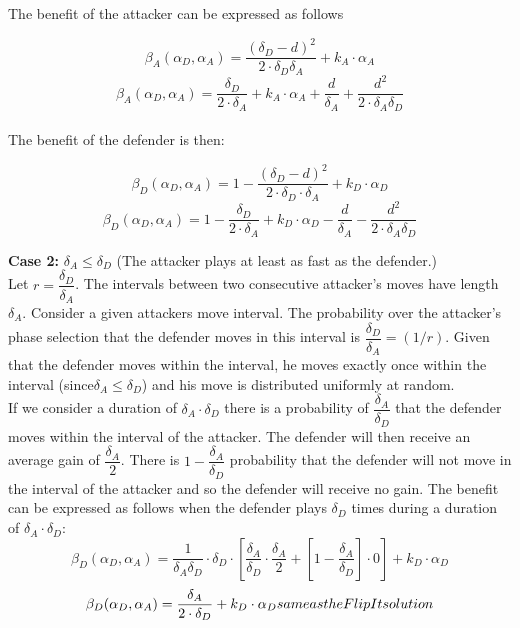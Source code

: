 The benefit of the attacker can be expressed as follows

\begin{equation}\label{first}
\beta_{A}(\alpha_{D},\alpha_{A}) = \dfrac { (\delta_{D}-d) ^{2}} {2 \cdot \delta_{D}  \delta_{A}} + k_{A} \cdot \alpha_{A}
\end{equation}
\begin{equation}\label{first}
\beta_{A}(\alpha_{D},\alpha_{A}) = \dfrac { \delta_{D}} {2 \cdot \delta_{A}} + k_{A} \cdot \alpha_{A} + \dfrac{d}{\delta_{A}} + \dfrac{d^{2}}{2 \cdot \delta_{A} \delta_{D}}
\end{equation}
\\

The benefit of the defender is then:

\begin{equation}\label{first}
\beta_{D}(\alpha_{D},\alpha_{A}) = 1 - \dfrac { (\delta_{D}-d) ^{2}} {2 \cdot \delta_{D} \cdot \delta_{A}} + k_{D} \cdot \alpha_{D}
\end{equation}
\begin{equation}\label{first}
\beta_{D}(\alpha_{D},\alpha_{A}) = 1 - \dfrac { \delta_{D}} {2 \cdot \delta_{A}} + k_{D} \cdot \alpha_{D} - \dfrac{d}{\delta_{A}}- \dfrac{d^{2}}{2 \cdot \delta_{A} \delta_{D}}
\end{equation}


\textbf{Case 2:} $\delta_{A} \leq \delta_{D} $ (The attacker plays at least as fast as the defender.) \\

Let $r = \dfrac{\delta_{D}}{ \delta_{A} }$. The intervals between two consecutive attacker's moves have length $\delta_{A}$. Consider a given attackers move interval. The probability over the attacker's phase selection that the defender moves in this interval is $\dfrac{\delta_{D}}{ \delta_{A} } = (1/r)$. Given that the defender moves within the interval, he moves exactly once within the interval (since$\delta_{A} \leq \delta_{D} $) and his move is distributed uniformly at random. \\

If we consider a duration of $\delta_{A} \cdot \delta_{D} $ there is a probability of $\dfrac{\delta_{A} } {\delta_{D}} $ that the defender moves within the interval of the attacker. The defender will then receive an average gain of $\dfrac{\delta_{A}} {2} $. There is $1- \dfrac{\delta_{A} } {\delta_{D}} $ probability that the defender will not move in the interval of the attacker and so the defender will receive no gain. The benefit can be expressed as follows when the  defender plays $\delta_{D}$ times during a duration of $\delta_{A} \cdot \delta_{D}$:
\begin{equation}\label{first}
\beta_{D}(\alpha_{D},\alpha_{A}) = \dfrac { 1} {\delta_{A} \delta_{D}} \cdot \delta_{D} \cdot [ \dfrac{\delta_{A}}{\delta_{D}} \cdot \dfrac{\delta_{A}}{2}+[ 1-\dfrac{\delta_{A}}{ \delta_{D}}] \cdot 0 ] + k_{D} \cdot \alpha_{D}
\end{equation}
\begin{equation}\label{first}
\beta_{D}(\alpha_{D},\alpha_{A}) = \dfrac {\delta_{A} }{2 \cdot \delta_{D}} + k_{D} \cdot \alpha_{D} $$same as the FlipIt solution$$
\end{equation}

